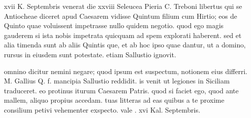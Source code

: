 


 xvii K. Septembris venerat die xxviii Seleucea Pieria C. Treboni libertus qui se Antiocheae diceret apud Caesarem vidisse Quintum filium cum Hirtio; eos de Quinto quae voluissent impetrasse nullo quidem negotio. quod ego magis gauderem si ista nobis impetrata quicquam ad spem explorati haberent. sed et alia timenda sunt ab aliis Quintis que, et ab hoc ipso quae dantur, ut a domino, rursus in eiusdem sunt potestate. etiam Sallustio ignovit.

 omnino dicitur nemini negare; quod ipsum est suspectum, notionem eius differri. M. Gallius Q. f. mancipia Sallustio reddidit. is venit ut legiones in Siciliam traduceret. eo protinus iturum Caesarem Patris. quod si faciet ego, quod ante mallem, aliquo propius accedam. tuas litteras ad eas quibus a te proxime consilium petivi vehementer exspecto. vale . xvi Kal. Septembris.
